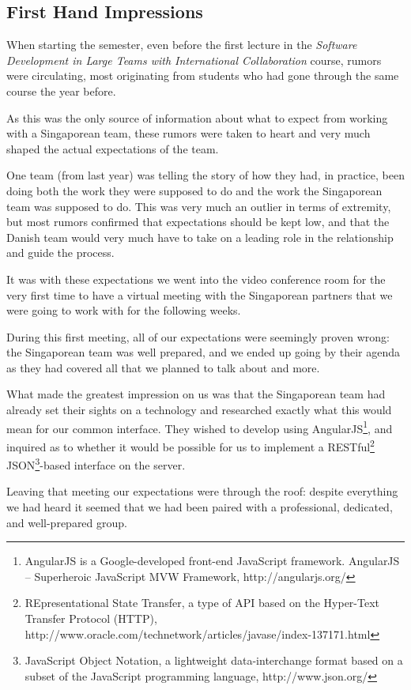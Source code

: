 \subsection{First Hand Impressions}
When starting the semester, even before the first lecture in the \emph{Software Development in Large Teams
with International Collaboration} course, rumors were circulating, most originating from students who had
gone through the same course the year before.

As this was the only source of information about what to expect from working with a Singaporean team, these
rumors were taken to heart and very much shaped the actual expectations of the team.

One team (from last year) was telling the story of how they had, in practice, been doing both the work they
were supposed to do and the work the Singaporean team was supposed to do. This was very much an outlier in
terms of extremity, but most rumors confirmed that expectations should be kept low, and that the Danish
team would very much have to take on a leading role in the relationship and guide the process.

It was with these expectations we went into the video conference room for the very first time to have a
virtual meeting with the Singaporean partners that we were going to work with for the following weeks.

During this first meeting, all of our expectations were seemingly proven wrong: the Singaporean team was well
prepared, and we ended up going by their agenda as they had covered all that we planned to talk about and more.

What made the greatest impression on us was that the Singaporean team had already set their sights on a
technology and researched exactly what this would mean for our common interface. They wished to develop using
AngularJS\footnote{AngularJS is a Google-developed front-end JavaScript framework. AngularJS – Superheroic
JavaScript MVW Framework, http://angularjs.org/}, and inquired as to whether it would be possible
for us to implement a RESTful\footnote{REpresentational State Transfer, a type of API based on the Hyper-Text
Transfer Protocol (HTTP), http://www.oracle.com/technetwork/articles/javase/index-137171.html} JSON\footnote{
JavaScript Object Notation, a lightweight data-interchange format based on a subset of the JavaScript
programming language, http://www.json.org/}-based interface on the server.

Leaving that meeting our expectations were through the roof: despite everything we had heard it seemed that
we had been paired with a professional, dedicated, and well-prepared group.